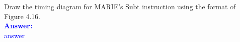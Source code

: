 \item{}
Draw the timing diagram for MARIE’s Subt instruction using the format of Figure 4.16.\\[12pt]
\ifanswers
\textcolor{blue}{
\textbf{Answer:}\\
answer
}
\newpage
\fi

